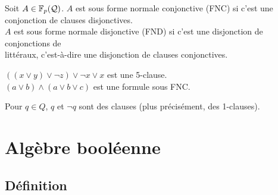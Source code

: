 		\begin{Definition}
			Soit \(A \in \mathbb{F}_p(\mathcal{Q})\). \nt
			\bdot \(A\) est sous forme normale conjonctive (FNC) si c'est une conjonction de clauses disjonctives. \\
			\bdot \(A\) est sous forme normale disjonctive (FND) si c'est une disjonction de conjonctions de \\ \listspace littéraux, c'est-à-dire une disjonction de clauses conjonctives.
		\end{Definition}
		\begin{Exemples}
			\(((x \vee y) \vee \neg z) \vee \neg x \vee x\) est une 5-clause. \\
			\hspace*{23.1mm} \((a \vee b) \wedge (a \vee b \vee c)\) est une formule sous FNC.
		\end{Exemples}
		
		\begin{Remarque}
			Pour \(q \in Q\), \(q\) et \(\neg q\) sont des clauses (plus précisément, des 1-clauses).
		\end{Remarque}
		
\section{Algèbre booléenne}

	\subsection{Définition}
		
